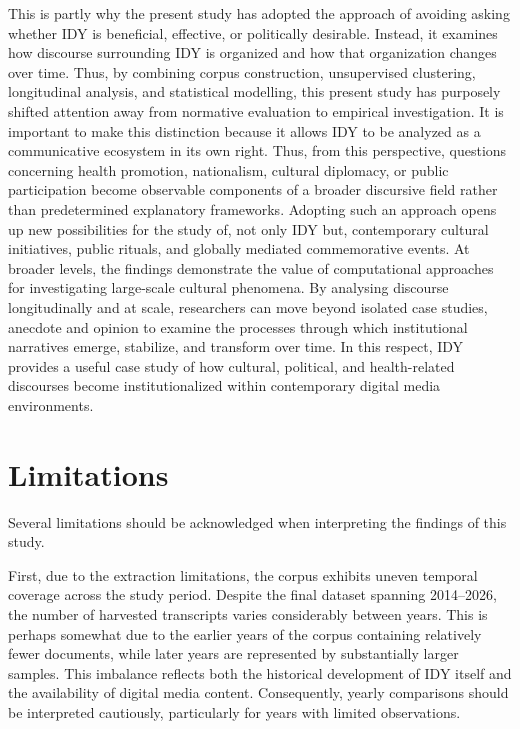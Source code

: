 \documentclass[11pt]{article}
\begin{document}
This is partly why the present study has adopted the approach of avoiding asking whether IDY is beneficial, effective, or politically desirable. Instead, it examines how discourse surrounding IDY is organized and how that organization changes over time. Thus, by combining corpus construction, unsupervised clustering, longitudinal analysis, and statistical modelling, this present study has purposely shifted attention away from normative evaluation to empirical investigation. It is important to make this distinction because it allows IDY to be analyzed as a communicative ecosystem in its own right. Thus, from this perspective, questions concerning health promotion, nationalism, cultural diplomacy, or public participation become observable components of a broader discursive field rather than predetermined explanatory frameworks. Adopting such an approach opens up new possibilities for the study of, not only IDY but, contemporary cultural initiatives, public rituals, and globally mediated commemorative events. At broader levels, the findings demonstrate the value of computational approaches for investigating large-scale cultural phenomena. By analysing discourse longitudinally and at scale, researchers can move beyond isolated case studies, anecdote and opinion to examine the processes through which institutional narratives emerge, stabilize, and transform over time. In this respect, IDY provides a useful case study of how cultural, political, and health-related discourses become institutionalized within contemporary digital media environments.


\section{Limitations}

Several limitations should be acknowledged when interpreting the findings of this study.

First, due to the extraction limitations, the corpus exhibits uneven temporal coverage across the study period. Despite the final dataset spanning 2014--2026, the number of harvested transcripts varies considerably between years. This is perhaps somewhat due to the earlier years of the corpus containing relatively fewer documents, while later years are represented by substantially larger samples. This imbalance reflects both the historical development of IDY itself and the availability of digital media content. Consequently, yearly comparisons should be interpreted cautiously, particularly for years with limited observations.
\end{document}
